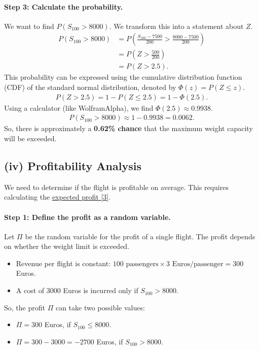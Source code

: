\documentclass[11pt,a4paper]{article}
\begin{document}
\paragraph{Step 3: Calculate the probability.}
We want to find $P(S_{100} > 8000)$. We transform this into a statement about $Z$.
\begin{align*}
    P(S_{100} > 8000) &= P\left(\frac{S_{100} - 7500}{200} > \frac{8000 - 7500}{200}\right) \\
    &= P\left(Z > \frac{500}{200}\right) \\
    &= P(Z > 2.5).
\end{align*}
This probability can be expressed using the cumulative distribution function (CDF) of the standard normal distribution, denoted by $\Phi(z) = P(Z \le z)$.
\begin{align*}
    P(Z > 2.5) = 1 - P(Z \le 2.5) = 1 - \Phi(2.5).
\end{align*}
Using a calculator (like WolframAlpha), we find $\Phi(2.5) \approx 0.9938$.
\begin{align*}
    P(S_{100} > 8000) \approx 1 - 0.9938 = 0.0062.
\end{align*}
So, there is approximately a \textbf{0.62\% chance} that the maximum weight capacity will be exceeded.

\subsection*{(iv) Profitability Analysis}
We need to determine if the flight is profitable on average. This requires calculating the \hyperlink{concept:ev}{expected profit [3]}.

\paragraph{Step 1: Define the profit as a random variable.}
Let $\Pi$ be the random variable for the profit of a single flight. The profit depends on whether the weight limit is exceeded.
\begin{itemize}
    \item Revenue per flight is constant: $100 \text{ passengers} \times 3 \text{ Euros/passenger} = 300$ Euros.
    \item A cost of $3000$ Euros is incurred only if $S_{100} > 8000$.
\end{itemize}
So, the profit $\Pi$ can take two possible values:
\begin{itemize}
    \item $\Pi = 300$ Euros, if $S_{100} \le 8000$.
    \item $\Pi = 300 - 3000 = -2700$ Euros, if $S_{100} > 8000$.
\end{itemize}
\end{document}
